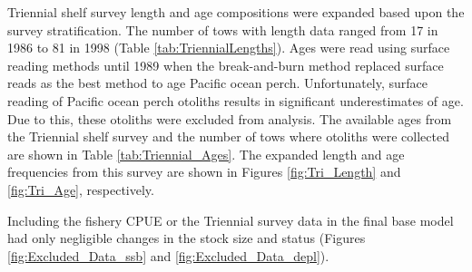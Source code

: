 \documentclass[12pt,]{article}
\begin{document}
Triennial shelf survey length and age compositions were expanded based
upon the survey stratification. The number of tows with length data
ranged from 17 in 1986 to 81 in 1998 (Table \ref{tab:TriennialLengths}).
Ages were read using surface reading methods until 1989 when the
break-and-burn method replaced surface reads as the best method to age
Pacific ocean perch. Unfortunately, surface reading of Pacific ocean
perch otoliths results in significant underestimates of age. Due to
this, these otoliths were excluded from analysis. The available ages
from the Triennial shelf survey and the number of tows where otoliths
were collected are shown in Table \ref{tab:Triennial_Ages}. The expanded
length and age frequencies from this survey are shown in Figures
\ref{fig:Tri_Length} and \ref{fig:Tri_Age}, respectively.

Including the fishery CPUE or the Triennial survey data in the final
base model had only negligible changes in the stock size and status
(Figures \ref{fig:Excluded_Data_ssb} and \ref{fig:Excluded_Data_depl}).
\end{document}

